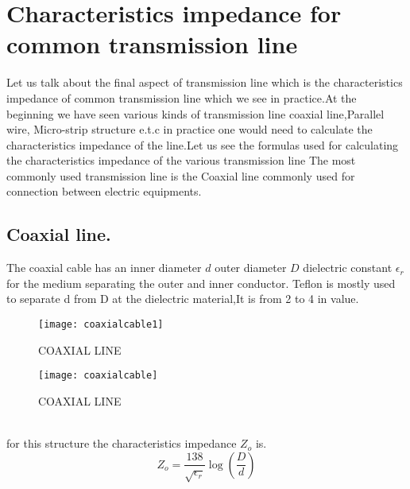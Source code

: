 \section{Characteristics impedance for common transmission line}
Let us talk about the final aspect of transmission line which is the characteristics impedance of common transmission line which we see in practice.At the beginning we have seen various kinds of transmission line coaxial line,Parallel wire, Micro-strip structure e.t.c in practice one would need to calculate the characteristics impedance of the line.Let us see the formulas used for calculating the characteristics impedance of the various transmission line The most commonly used transmission line is the Coaxial line commonly used for connection between  electric equipments.\\
\subsection{Coaxial line.}
The coaxial cable has an inner diameter $d$ outer  diameter $D$  dielectric constant $\epsilon_r$ for the medium separating the outer and inner conductor. Teflon is mostly used to separate d from D at the dielectric material,It is from 2 to 4 in value.
\begin{figure}[h]
	\centering
	\texttt{[image: coaxialcable1]}
	\caption{COAXIAL LINE}
\end{figure}
\begin{figure}[h]
	\centering
	\texttt{[image: coaxialcable]}
	\caption{COAXIAL LINE}
\end{figure}\\

for this structure the characteristics impedance $Z_o$ is.
\begin{equation*}
Z_o=\dfrac{138}{\sqrt{\epsilon_r}}\log(\dfrac{D}{d})
\end{equation*}
 
